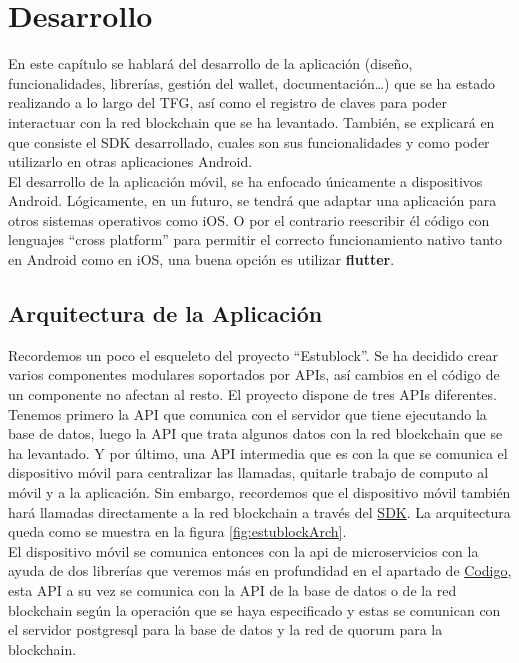 \chapter{Desarrollo}
\label{cap:Desarrollo}

\setlength{\parindent}{0pt}

En este capítulo se hablará del desarrollo de la aplicación (diseño, funcionalidades, librerías, gestión del wallet, documentación\dots) que se ha estado realizando a lo largo del TFG, así como el registro de claves para poder interactuar con la red blockchain que se ha levantado. También, se explicará en que consiste el SDK desarrollado, cuales son sus funcionalidades y como poder utilizarlo en otras aplicaciones Android. \\

El desarrollo de la aplicación móvil, se ha enfocado únicamente a dispositivos Android. Lógicamente, en un futuro, se tendrá que adaptar una aplicación para otros sistemas operativos como iOS. O por el contrario reescribir él código con lenguajes ``cross platform'' para permitir el correcto funcionamiento nativo tanto en Android como en iOS, una buena opción es utilizar \textbf{flutter}\cite{flutter}.

\section{Arquitectura de la Aplicación}

Recordemos un poco el esqueleto del proyecto ``Estublock''. Se ha decidido crear varios componentes modulares soportados por APIs, así cambios en el código de un componente no afectan al resto. El proyecto dispone de tres APIs diferentes. Tenemos primero la API que comunica con el servidor que tiene ejecutando la base de datos, luego la API que trata algunos datos con la red blockchain que se ha levantado. Y por último, una API intermedia que es con la que se comunica el dispositivo móvil para centralizar las llamadas, quitarle trabajo de computo al móvil y a la aplicación. Sin embargo, recordemos que el dispositivo móvil también hará llamadas directamente a la red blockchain a través del \hyperref[sec:SDK]{SDK}. La arquitectura queda como se muestra en la figura \ref{fig:estublockArch}. \\

El dispositivo móvil se comunica entonces con la api de microservicios con la ayuda de dos librerías que veremos más en profundidad en el apartado de \hyperref[sec:Codigo]{Codigo}, esta API a su vez se comunica con la API de la base de datos o de la red blockchain según la operación que se haya especificado y estas se comunican con el servidor postgresql para la base de datos y la red de quorum para la blockchain. \\

